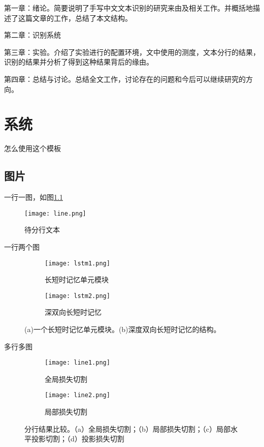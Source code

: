\documentclass[winfonts]{njuthesis}
\begin{document}
第一章：绪论。简要说明了手写中文文本识别的研究来由及相关工作。并概括地描述了这篇文章的工作，总结了本文结构。

第二章：识别系统

第三章：实验。介绍了实验进行的配置环境，文中使用的测度，文本分行的结果，识别的结果并分析了得到这种结果背后的缘由。

第四章：总结与讨论。总结全文工作，讨论存在的问题和今后可以继续研究的方向。

\chapter{系统}\label{chapter_system}

怎么使用这个模板

\section{图片}

一行一图，如图\ref{fig:line}
\begin{figure}[htbp]
   \centering
   \texttt{[image: line.png]} %
   \caption{待分行文本}
   \label{fig:line}
\end{figure}


一行两个图
\begin{figure}[ht!]
    \centering
    \begin{subfigure}{.5\textwidth}
    	\centering
        \texttt{[image: lstm1.png]}
        \caption{长短时记忆单元模块}
    \end{subfigure}
    \begin{subfigure}{.4\textwidth}
    	\centering
        \texttt{[image: lstm2.png]}
        \caption{深双向长短时记忆}
        \label{fig:lstm2}
    \end{subfigure}
    \caption{(a)一个长短时记忆单元模块。(b)深度双向长短时记忆的结构。}
\label{fig:lstm}
\end{figure}

多行多图
\begin{figure}[ht!]
    \centering
    \begin{subfigure}{\textwidth}
        \centering
        \texttt{[image: line1.png]}
        \caption{全局损失切割}
        \label{fig:line1}
    \end{subfigure}
    \begin{subfigure}{\textwidth}
    	\centering
        \texttt{[image: line2.png]}
        \caption{局部损失切割}
        \label{fig:line2}
    \end{subfigure}
    \caption{分行结果比较。（a）全局损失切割；（b）局部损失切割；（c）局部水平投影切割；（d）投影损失切割}
\end{figure}
\end{document}
